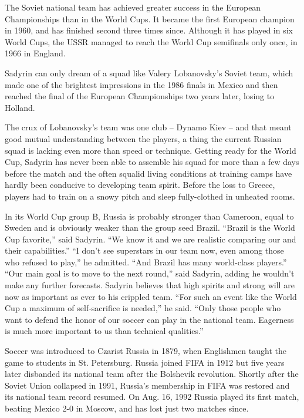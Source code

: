 The Soviet national team has achieved greater success in the European 
Championships than in the World Cups. It became the first European champion in
1960, and has finished second three times since. Although it has played in six 
World Cups, the USSR managed to reach the World Cup semifinals only once, in 
1966 in England.

Sadyrin can only dream of a squad like Valery Lobanovsky's Soviet team, which
made one of the brightest impressions in the 1986 finals in Mexico and then
reached the final of the European Championships two years later, losing to
Holland.

The crux of Lobanovsky's team was one club -- Dynamo Kiev -- and that meant
good mutual understanding between the players, a thing the current Russian 
squad is lacking even more than speed or technique. Getting ready for the World 
Cup, Sadyrin has never been able to assemble his squad for more than a few days 
before the match and the often squalid living conditions at training camps have
hardly been conducive to developing team spirit. Before the loss to Greece, 
players had to train on a snowy pitch and sleep fully-clothed in unheated rooms.

In its World Cup group B, Russia is probably stronger than Cameroon, equal to
Sweden and is obviously weaker than the group seed Brazil. ``Brazil is the World 
Cup favorite,'' said Sadyrin. ``We know it and we are realistic comparing our and 
their capabilities.'' ``I don't see superstars in our team now, even among those 
who refused to play,'' he admitted. ``And Brazil has many world-class players.''
``Our main goal is to move to the next round,'' said Sadyrin, adding he wouldn't 
make any further forecasts. Sadyrin believes that high spirits and strong will 
are now as important as ever to his crippled team. ``For such an event like the 
World Cup a maximum of self-sacrifice is needed,'' he said. ``Only those people 
who want to defend the honor of our soccer can play in the national team. 
Eagerness is much more important to us than technical qualities.''

Soccer was introduced to Czarist Russia in 1879, when Englishmen taught the
game to students in St. Petersburg. Russia joined FIFA in 1912 but five years
later disbanded its national team after the Bolshevik revolution. Shortly after 
the Soviet Union collapsed in 1991, Russia's membership in FIFA was restored 
and its national team record resumed. On Aug. 16, 1992 Russia played its first 
match, beating Mexico 2-0 in Moscow, and has lost just two matches since.
